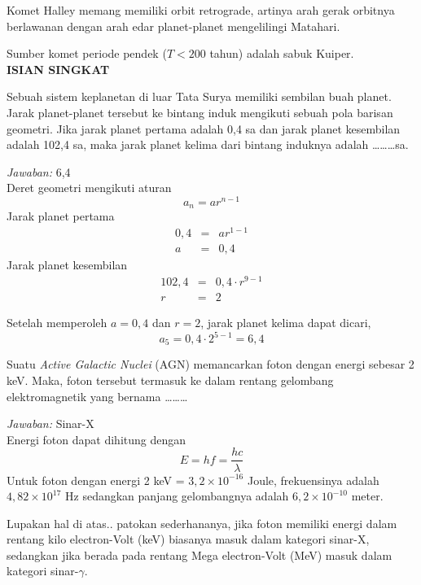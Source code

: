\documentclass[11pt,fleqn]{exam}
\begin{document}
\begin{questions}
Komet Halley memang memiliki orbit retrograde, artinya arah gerak orbitnya berlawanan dengan arah edar planet-planet mengelilingi Matahari.

Sumber komet periode pendek ($T < 200$ tahun) adalah sabuk Kuiper.\\

\vspace{0.5cm}
\textbf{ISIAN SINGKAT}

\question [10] Sebuah sistem keplanetan di luar Tata Surya memiliki sembilan buah planet. Jarak planet-planet tersebut ke bintang induk mengikuti sebuah pola barisan geometri. Jika jarak planet pertama adalah 0,4 sa dan jarak planet kesembilan adalah 102,4 sa, maka jarak planet kelima dari bintang induknya adalah \ldots\ldots\ldots sa.

\textit{Jawaban: } 6,4\\

Deret geometri mengikuti aturan
\begin{equation*}
a_n = a r^{n-1}
\end{equation*}
Jarak planet pertama 
\begin{eqnarray*}
0,4 &=& a r^{1-1} \\
a &=& 0,4
\end{eqnarray*}
Jarak planet kesembilan
\begin{eqnarray*}
102,4 &=& 0,4 \cdot r^{9 - 1}\\
r &=& 2
\end{eqnarray*} 

Setelah memperoleh $a = 0,4$ dan $r = 2$, jarak planet kelima dapat dicari,
\begin{equation*}
a_5 = 0,4 \cdot 2^{5-1} = 6,4
\end{equation*}

\question [10] Suatu \textit{Active Galactic Nuclei} (AGN) memancarkan foton dengan energi sebesar 2 keV. Maka, foton tersebut termasuk ke dalam rentang gelombang elektromagnetik yang bernama \ldots\ldots\ldots

\textit{Jawaban: } Sinar-X\\

Energi foton dapat dihitung dengan
\begin{equation}
E = h f = \frac{h c}{\lambda}
\end{equation}
Untuk foton dengan energi 2 keV = $3,2 \times 10^{-16}$ Joule, frekuensinya adalah $4,82 \times 10^{17}$ Hz sedangkan panjang gelombangnya adalah $6,2 \times 10^{-10}$ meter.

Lupakan hal di atas.. patokan sederhananya, jika foton memiliki energi dalam rentang kilo electron-Volt (keV) biasanya masuk dalam kategori sinar-X, sedangkan jika berada pada rentang Mega electron-Volt (MeV) masuk dalam kategori sinar-$\gamma$.


\end{questions}
\end{document}
